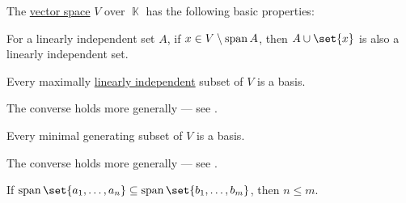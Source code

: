 \begin{proposition}\label{thm:def:vector_space}
  The \hyperref[def:vector_space]{vector space} \( V \) over \( \BbbK \) has the following basic properties:
  \begin{thmenum}
     For a linearly independent set \( A \), if \( x \in V \setminus \operatorname{span} A \), then \( A \cup \set{ x } \) is also a linearly independent set.

     Every maximally \hyperref[thm:def:linear_dependence]{linearly independent} subset of \( V \) is a basis.

    The converse holds more generally --- see .

     Every minimal generating subset of \( V \) is a basis.

    The converse holds more generally --- see .

     If \( \linspan\set{ a_1, \ldots, a_n } \subseteq \linspan\set{ b_1, \ldots, b_m } \), then \( n \leq m \).
  \end{thmenum}
\end{proposition}
